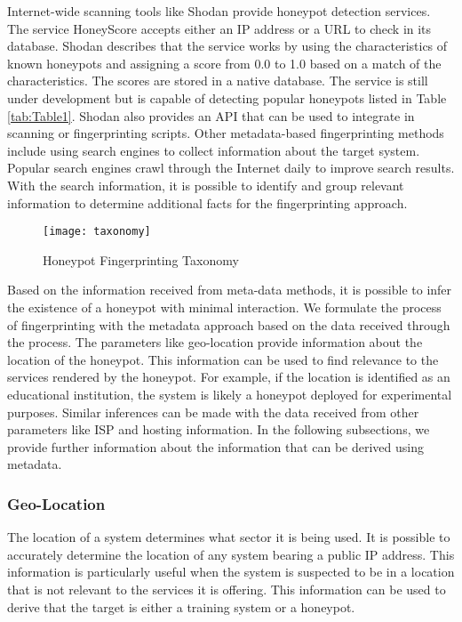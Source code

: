 Internet-wide scanning tools like Shodan provide honeypot detection services. The service HoneyScore accepts either an IP address or a URL to check in its database. Shodan describes that the service works by using the characteristics of known honeypots and assigning a score from 0.0 to 1.0 based on a match of the characteristics. The scores are stored in a native database. The service is still under development but is capable of detecting popular honeypots listed in Table \ref{tab:Table1}. Shodan also provides an API that can be used to integrate in scanning or fingerprinting scripts. Other metadata-based fingerprinting methods include using search engines to collect information about the target system. Popular search engines crawl through the Internet daily to improve search results. With the search information, it is possible to identify and group relevant information to determine additional facts for the fingerprinting approach. 

\begin{figure}
    \centering
    \texttt{[image: taxonomy]}
    \caption{Honeypot Fingerprinting Taxonomy}
    \label{fig:taxonomy}
\end{figure}


Based on the information received from meta-data methods, it is possible to infer the existence of a honeypot with minimal interaction. We formulate the process of fingerprinting with the metadata approach based on the data received through the process. The parameters like geo-location provide information about the location of the honeypot. This information can be used to find relevance to the services rendered by the honeypot. For example, if the location is identified as an educational institution, the system is likely a honeypot deployed for experimental purposes. Similar inferences can be made with the data received from other parameters like ISP and hosting information. In the following subsections, we provide further information about the information that can be derived using metadata. 

\subsubsection{Geo-Location}
The location of a system determines what sector it is being used. It is possible to accurately determine the location of any system bearing a public IP address. This information is particularly useful when the system is suspected to be in a location that is not relevant to the services it is offering. This information can be used to derive that the target is either a training system or a honeypot. 


